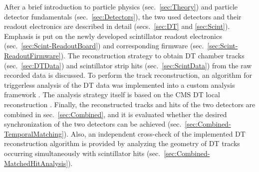 \par After a brief introduction to particle physics (sec.\ \ref{sec:Theory}) and particle detector fundamentals (sec.\ \ref{sec:Detectors}), the two used detectors and their readout electronics are described in detail (secs.\ \ref{sec:DT} and \ref{sec:Scint}). Emphasis is put on the newly developed scintillator readout electronics (sec.\ \ref{sec:Scint-ReadoutBoard}) and corresponding firmware (sec.\ \ref{sec:Scint-ReadoutFirmware}). The reconstruction strategy to obtain \ac{DT} chamber tracks (sec.\ \ref{sec:DTData}) and scintillator strip hits (sec.\ \ref{sec:ScintData}) from the raw recorded data is discussed. To perform the track reconstruction, an algorithm for triggerless analysis of the \ac{DT} data was implemented into a custom analysis framework \cite{dt-scint-analysis-tools-Main}. The analysis strategy itself is based on the \ac{CMS} \ac{DT} local reconstruction \cite{DT-LocalReco}. Finally, the reconstructed tracks and hits of the two detectors are combined in sec.\ \ref{sec:Combined}, and it is evaluated whether the desired synchronization of the two detectors can be achieved (sec.\ \ref{sec:Combined-TemporalMatching}). Also, an independent cross-check of the implemented \ac{DT} reconstruction algorithm is provided by analyzing the geometry of \ac{DT} tracks occurring simultaneously with scintillator hits (sec.\ \ref{sec:Combined-MatchedHitAnalysis}).



